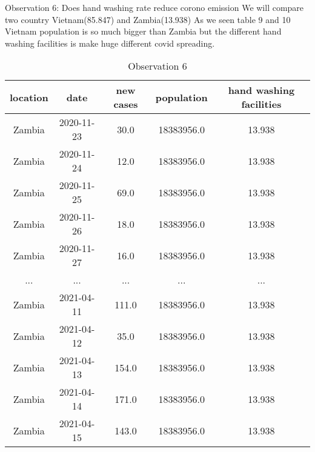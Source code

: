 \documentclass[a4 paper]{article}
\newcommand{\0}{\mathbf{0}}
\begin{document}
\begin{itemize}
    Observation 6:
    Does hand washing rate reduce corono emission\newline
    We will compare two country Vietnam(85.847) and Zambia(13.938)\newline
    As we seen table 9 and 10 Vietnam population is so much bigger than Zambia but the different hand washing facilities is make huge different covid spreading.\newline
    \begin{table}[!ht]
    \centering
    \caption{Observation 6}
    \label{tab:Ob61}
    \begin{tabular}{|c|c|c|c|c|}
    \hline
        location    &    date&  new cases & population & hand washing facilities\\\hline
        Zambia & 2020-11-23 & 30.0 & 18383956.0 & 13.938\\\hline
        Zambia & 2020-11-24 & 12.0 & 18383956.0 & 13.938\\\hline
        Zambia & 2020-11-25 & 69.0 & 18383956.0 & 13.938\\\hline
        Zambia & 2020-11-26 & 18.0 & 18383956.0 & 13.938\\\hline
        Zambia & 2020-11-27 & 16.0 & 18383956.0 & 13.938\\\hline
        ... & ... & ... & ... & ...\\\hline
        Zambia & 2021-04-11 &     111.0 & 18383956.0 & 13.938\\\hline
        Zambia & 2021-04-12 &  35.0 & 18383956.0 & 13.938\\\hline
        Zambia & 2021-04-13 &     154.0 & 18383956.0 & 13.938\\\hline
        Zambia & 2021-04-14 &     171.0 & 18383956.0 & 13.938\\\hline
        Zambia & 2021-04-15 &     143.0 & 18383956.0 & 13.938\\\hline
    
    \end{tabular}
    \end{table}
    

\end{itemize}
\end{document}
